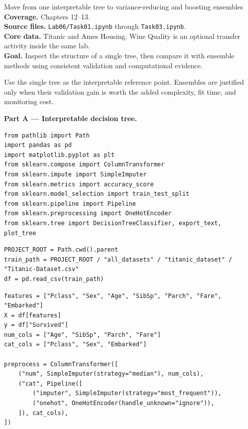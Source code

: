 
\begin{labproject}{Move from one interpretable tree to variance-reducing and boosting ensembles}
\textbf{Coverage.} Chapters 12--13.\\
\textbf{Source files.} \texttt{Lab06/Task01.ipynb} through \texttt{Task03.ipynb}.\\
\textbf{Core data.} Titanic and Ames Housing. Wine Quality is an optional transfer activity inside the same lab.\\
\textbf{Goal.} Inspect the structure of a single tree, then compare it with ensemble methods using consistent validation and computational evidence.

\begin{labmode}
Use the single tree as the interpretable reference point. Ensembles are justified only when their validation gain is worth the added complexity, fit time, and monitoring cost.
\end{labmode}

\medskip\noindent\textbf{Part A --- Interpretable decision tree.}\par
\begin{lstlisting}[style=mlpython]
from pathlib import Path
import pandas as pd
import matplotlib.pyplot as plt
from sklearn.compose import ColumnTransformer
from sklearn.impute import SimpleImputer
from sklearn.metrics import accuracy_score
from sklearn.model_selection import train_test_split
from sklearn.pipeline import Pipeline
from sklearn.preprocessing import OneHotEncoder
from sklearn.tree import DecisionTreeClassifier, export_text, plot_tree
\end{lstlisting}

\begin{lstlisting}[style=mlpython]
PROJECT_ROOT = Path.cwd().parent
train_path = PROJECT_ROOT / "all_datasets" / "titanic_dataset" / "Titanic-Dataset.csv"
df = pd.read_csv(train_path)
\end{lstlisting}

\begin{lstlisting}[style=mlpython]
features = ["Pclass", "Sex", "Age", "SibSp", "Parch", "Fare", "Embarked"]
X = df[features]
y = df["Survived"]
num_cols = ["Age", "SibSp", "Parch", "Fare"]
cat_cols = ["Pclass", "Sex", "Embarked"]

preprocess = ColumnTransformer([
    ("num", SimpleImputer(strategy="median"), num_cols),
    ("cat", Pipeline([
        ("imputer", SimpleImputer(strategy="most_frequent")),
        ("onehot", OneHotEncoder(handle_unknown="ignore")),
    ]), cat_cols),
])


\end{lstlisting}
\end{labproject}
